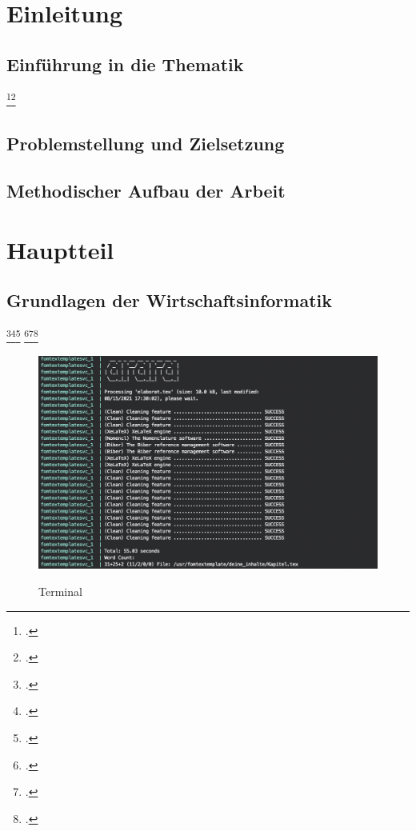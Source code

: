 \section{Einleitung}
\subsection{Einführung in die Thematik}
\blindtext{}
\blindtext\footcite[][]{mswpf}\footcite[][19]{sadtler_rechtskonformes_2017}

\subsection{Problemstellung und Zielsetzung}
\blindtext

\subsection{Methodischer Aufbau der Arbeit}
\blindtext

\section{Hauptteil}
\subsection{Grundlagen der Wirtschaftsinformatik}
\blindtext\footcite[][]{msdatabind}\footcite[][]{Atypisch}\footcite[][34]{Digitaloekonomie}
\blindenumerate
\blindtext
\footcite[][415-426]{Tanenbaum2016}\footcite[][223]{mandl_internet_2019}\footcite[][123-124]{mertens_digitalisierung_2017}

\begin{figure}[!htb]
    \caption{Terminal}
    \includegraphics[width=1\textwidth]{.github/terminal}
    \captionsetup{width=1\textwidth}
    \label{abb_bsp}
\end{figure}
\blindtext

